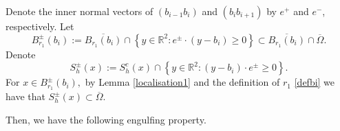 \documentclass[11pt]{amsart}
\theoremstyle{plain}
\newcommand{\0}{\textbf{0}}
\numberwithin{equation}{section}
\numberwithin{equation}{section}
\numberwithin{figure}{section}
\begin{document}
	Denote the inner normal vectors of $(b_{i-1}b_i)$ and $(b_{i}b_{i+1})$ by $e^{+}$ and $e^{-}$, respectively. 
	Let 
	\begin{equation}\label{halfball}
		B^{\pm}_{r_1}(b_i):=\overline{B_{r_1}(b_i)}\cap\left\{y\in \mathbb{R}^2 : e^{\pm}\cdot (y-b_i)\geq 0\right\}
		\subset \overline{B_{r_1}(b_i)}\cap \overline{\Omega}.
	\end{equation}
	Denote 
	\begin{equation}\label{halfsection}
		S^{\pm}_h(x):=S^c_h(x)\cap \left\{y\in \mathbb{R}^2: (y-b_i)\cdot e^{\pm}\geq 0\right\}.
	\end{equation} 
	For $x\in B^{\pm}_{r_1}(b_i),$ by Lemma \ref{localisation1} and the definition of $r_1$ \eqref{defbi} 
	we have that $S^{\pm}_h(x)\subset \overline{\Omega}.$ 
	
	Then, we have the following engulfing property.
	
\end{document}

